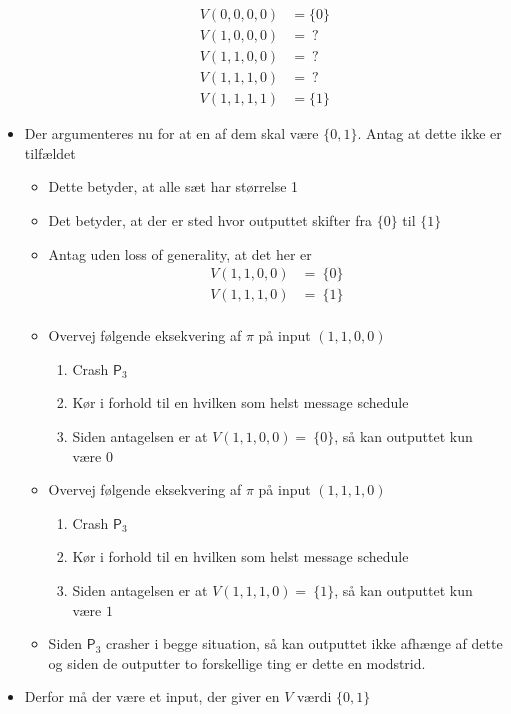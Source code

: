 \documentclass[a4, english]{article}
\begin{document}
\begin{itemize}
  \begin{align*}
    V(0,0,0,0) &= \{0\} \\
    V(1,0,0,0) &= \ ? \\
    V(1,1,0,0) &= \ ? \\
    V(1,1,1,0) &= \ ? \\
    V(1,1,1,1) &= \{1\} 
  \end{align*}
  \item Der argumenteres nu for at en af dem skal være $\{0,1\}$. Antag at dette ikke er tilfældet
  \begin{itemize}
  	\item Dette betyder, at alle sæt har størrelse 1
    \item Det betyder, at der er sted hvor outputtet skifter fra $\{0\}$ til $\{1\}$
    \item Antag uden loss of generality, at det her er 
    \begin{align*}
      V(1,1,0,0) &= \ \{0\} \\
      V(1,1,1,0) &= \ \{1\} \\
    \end{align*}
    \item Overvej følgende eksekvering af $\pi$ på input $(1,1,0,0)$  
    \begin{enumerate}
    	\item Crash $\mathsf P_3$  
      \item Kør i forhold til en hvilken som helst message schedule 
      \item Siden antagelsen er at $V(1,1,0,0) = \ \{0\}$, så kan outputtet kun være $0$ 
    \end{enumerate}
    \item Overvej følgende eksekvering af $\pi$ på input $(1,1,1,0)$  
    \begin{enumerate}
    	\item Crash $\mathsf P_3$  
      \item Kør i forhold til en hvilken som helst message schedule 
      \item Siden antagelsen er at $V(1,1,1,0) = \ \{1\}$, så kan outputtet kun være $1$ 
    \end{enumerate}
    \item Siden $\mathsf P_3$ crasher i begge situation, så kan outputtet ikke afhænge af dette og siden de outputter to forskellige ting er dette en modstrid. 
  \end{itemize} 
  \item Derfor må der være et input, der giver en $V$ værdi $\{0,1\}$  

\end{itemize}
\end{document}
